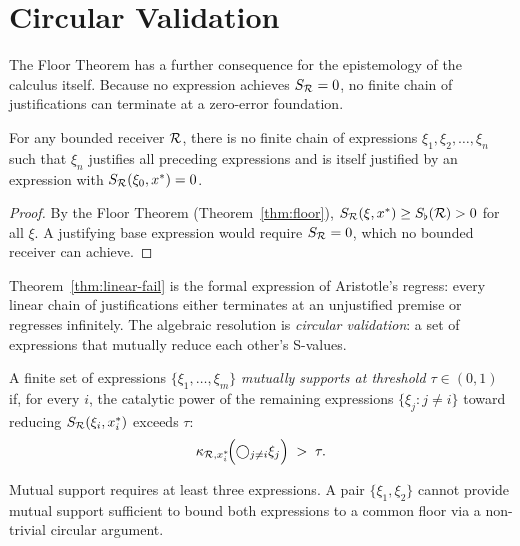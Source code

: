 \section{Circular Validation}
\label{sec:circular-validation}

The Floor Theorem has a further consequence for the epistemology of the calculus itself. Because no expression achieves $S_{\mathcal{R}} = 0$, no finite chain of justifications can terminate at a zero-error foundation.

\begin{theorem}\label{thm:linear-fail}
For any bounded receiver $\mathcal{R}$, there is no finite chain of expressions $\xi_1, \xi_2, \ldots, \xi_n$ such that $\xi_n$ justifies all preceding expressions and is itself justified by an expression with $S_{\mathcal{R}}(\xi_0, x^*) = 0$.
\end{theorem}

\begin{proof}
By the Floor Theorem (Theorem~\ref{thm:floor}), $S_{\mathcal{R}}(\xi, x^*) \geq S_{\flat}(\mathcal{R}) > 0$ for all $\xi$. A justifying base expression would require $S_{\mathcal{R}} = 0$, which no bounded receiver can achieve.
\end{proof}

Theorem~\ref{thm:linear-fail} is the formal expression of Aristotle's regress: every linear chain of justifications either terminates at an unjustified premise or regresses infinitely. The algebraic resolution is \emph{circular validation}: a set of expressions that mutually reduce each other's S-values.

\begin{definition}\label{def:mutual-support}
A finite set of expressions $\{\xi_1, \ldots, \xi_m\}$ \emph{mutually supports at threshold $\tau \in (0,1)$} if, for every $i$, the catalytic power of the remaining expressions $\{\xi_j : j \neq i\}$ toward reducing $S_{\mathcal{R}}(\xi_i, x^*_i)$ exceeds $\tau$:
\[
\kappa_{\mathcal{R}, x^*_i}\!\Bigl(\bigcirc_{j \neq i} \xi_j\Bigr) \;>\; \tau.
\]
\end{definition}

\begin{theorem}\label{thm:circ-valid-nec}
Mutual support requires at least three expressions. A pair $\{\xi_1, \xi_2\}$ cannot provide mutual support sufficient to bound both expressions to a common floor via a non-trivial circular argument.
\end{theorem}

